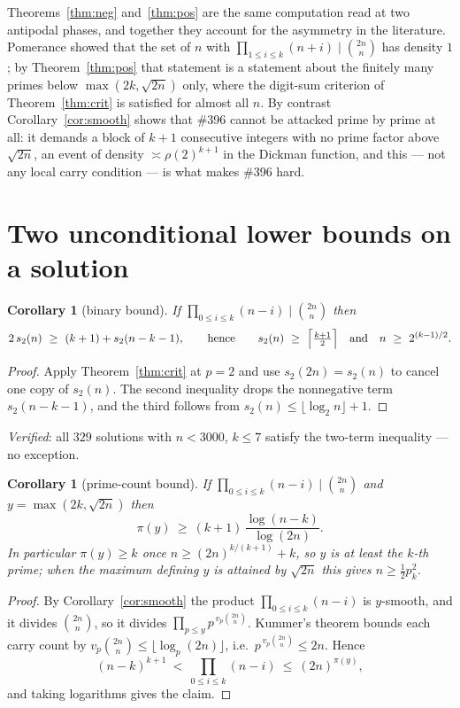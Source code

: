 \documentclass[11pt]{article}
\newtheorem{corollary}[theorem]{Corollary}
\begin{document}
Theorems~\ref{thm:neg} and~\ref{thm:pos} are the same computation read at two antipodal
phases, and together they account for the asymmetry in the literature.  Pomerance showed
that the set of $n$ with $\prod_{1\le i\le k}(n+i)\mid\binom{2n}{n}$ has density $1$; by
Theorem~\ref{thm:pos} that statement is a statement about the finitely many primes below
$\max(2k,\sqrt{2n})$ only, where the digit-sum criterion of Theorem~\ref{thm:crit} is
satisfied for almost all $n$.  By contrast Corollary~\ref{cor:smooth} shows that \#396
cannot be attacked prime by prime at all: it demands a block of $k+1$ consecutive integers
with no prime factor above $\sqrt{2n}$, an event of density $\asymp\rho(2)^{k+1}$ in the
Dickman function, and this --- not any local carry condition --- is what makes \#396 hard.

\section{Two unconditional lower bounds on a solution}

\begin{corollary}[binary bound]\label{cor:binary}
If $\prod_{0\le i\le k}(n-i)\mid\binom{2n}{n}$ then
\[
  2\,s_2(n)\ \ge\ (k+1)+s_2(n-k-1),
  \qquad\text{hence}\qquad
  s_2(n)\ \ge\ \Bigl\lceil\tfrac{k+1}{2}\Bigr\rceil
  \quad\text{and}\quad n\ \ge\ 2^{(k-1)/2}.
\]
\end{corollary}

\begin{proof}
Apply Theorem~\ref{thm:crit} at $p=2$ and use $s_2(2n)=s_2(n)$ to cancel one copy of
$s_2(n)$.  The second inequality drops the nonnegative term $s_2(n-k-1)$, and the third
follows from $s_2(n)\le\lfloor\log_2 n\rfloor+1$.
\end{proof}

\emph{Verified}: all $329$ solutions with $n<3000$, $k\le7$ satisfy the two-term
inequality --- no exception.

\begin{corollary}[prime-count bound]\label{cor:picount}
If $\prod_{0\le i\le k}(n-i)\mid\binom{2n}{n}$ and $y=\max(2k,\sqrt{2n})$ then
\[
  \pi(y)\ \ge\ (k+1)\,\frac{\log(n-k)}{\log(2n)} .
\]
In particular $\pi(y)\ge k$ once $n\ge(2n)^{k/(k+1)}+k$, so $y$ is at least the $k$-th
prime; when the maximum defining $y$ is attained by $\sqrt{2n}$ this gives
$n\ge\frac12 p_k^{2}$.
\end{corollary}

\begin{proof}
By Corollary~\ref{cor:smooth} the product $\prod_{0\le i\le k}(n-i)$ is $y$-smooth, and it
divides $\binom{2n}{n}$, so it divides $\prod_{p\le y}p^{\,v_p\binom{2n}{n}}$.  Kummer's
theorem bounds each carry count by $v_p\binom{2n}{n}\le\lfloor\log_p(2n)\rfloor$, i.e.\
$p^{\,v_p\binom{2n}{n}}\le 2n$.  Hence
\[
  (n-k)^{k+1}\ <\ \prod_{0\le i\le k}(n-i)\ \le\ (2n)^{\pi(y)} ,
\]
and taking logarithms gives the claim.
\end{proof}
\end{document}
